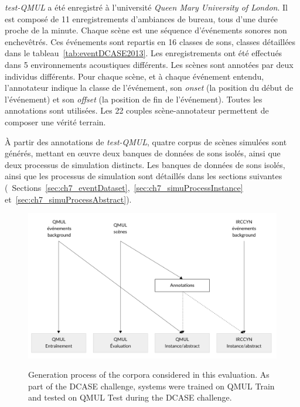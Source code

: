 \emph{test-QMUL} a été enregistré à l'université \emph{Queen Mary University of London}. Il est composé de 11 enregistrements d'ambiances de bureau, tous d'une durée proche de la minute. Chaque scène est une séquence d'événements sonores non enchevêtrés. Ces événements sont repartis en 16 classes de sons, classes détaillées dans le tableau~\ref{tab:eventDCASE2013}. Les enregistrements ont été effectués dans 5 environnements acoustiques différents. Les scènes sont annotées par deux individus différents. Pour chaque scène, et à chaque événement entendu, l'annotateur indique la classe de l'événement, son \emph{onset} (la position du début de l'événement) et son \emph{offset} (la position de fin de l'événement). Toutes les annotations sont utilisées. Les 22 couples scène-annotateur permettent de composer une vérité terrain.

À partir des annotations de \emph{test-QMUL}, quatre corpus de scènes simulées sont générés, mettant en œuvre deux banques de données de sons isolés, ainsi que deux processus de simulation distincts. Les banques de données de sons isolés, ainsi que les processus de simulation sont détaillés dans les sections suivantes (\cf~Sections~\ref{sec:ch7_eventDataset},~\ref{sec:ch7_simuProcessInstance} et~\ref{sec:ch7_simuProcessAbstract}). 

\begin{figure}[t]
\begin{center}
\includegraphics[width=1\textwidth]{gfx/ch_7/databasesTasslp.pdf}
\label{fig:databasesDCASE2013Simu}
\caption{Generation process of the corpora considered in this evaluation. As part of the DCASE challenge, systems were trained on QMUL Train and tested on QMUL Test during the DCASE challenge.} 
\end{center}
\end{figure}

